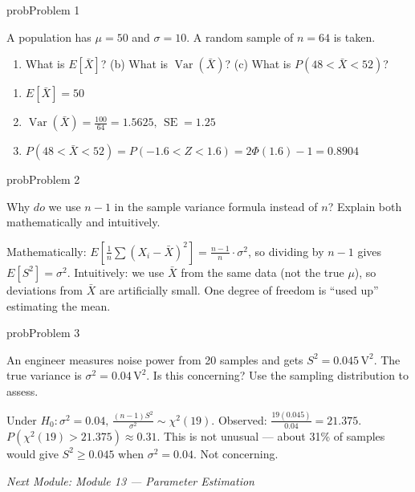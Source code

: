 \begin{PSbox}[unbreakable]{prob}{Problem 1}

A population has $\mu = 50$ and $\sigma = 10$. A random sample of $n = 64$ is taken.

\begin{enumerate}
\def\labelenumi{(\alph{enumi})}
\tightlist
\item
  What is $E[\bar{X}]$? (b) What is $\operatorname{Var}(\bar{X})$? (c) What is $P(48 < \bar{X} < 52)$?
\end{enumerate}

\PSsolution{} 

\begin{enumerate}
\def\labelenumi{(\alph{enumi})}
\tightlist
\item
  $E[\bar{X}] = 50$
\item
  $\displaystyle \operatorname{Var}(\bar{X}) = \frac{100}{64} = 1.5625,\, \operatorname{SE} = 1.25$
\item
  $P(48 < \bar{X} < 52) = P(-1.6 < Z < 1.6) = 2\Phi (1.6) - 1 = 0.8904$
\end{enumerate}

\end{PSbox}

\begin{PSbox}[unbreakable]{prob}{Problem 2}

Why $do$ we use $n-1$ in the sample variance formula instead of $n$? Explain both mathematically and intuitively.

\PSsolution{} Mathematically: $E\left[\frac{1}{n}\sum (X_{i}-\bar{X})^{2}\right] = \frac{n-1}{n} \cdot \sigma^{2}$, so dividing by $n-1$ gives $E[S^{2}] = \sigma^{2}$. Intuitively: we use $\bar{X}$ from the same data (not the true $\mu$), so deviations from $\bar{X}$ are artificially small. One degree of freedom is ``used up'' estimating the mean.

\end{PSbox}

\begin{PSbox}[unbreakable]{prob}{Problem 3}

An engineer measures noise power from 20 samples and gets $S^{2} = 0.045\,\mathrm{V}^{2}$. The true variance is $\sigma^{2} = 0.04\,\mathrm{V}^{2}$. Is this concerning? Use the sampling distribution to assess.

\PSsolution{} Under $H_{0}: \sigma^{2} = 0.04,\, \frac{(n-1)S^{2}}{\sigma^{2}} \sim \chi^{2}(19)$. Observed: $\frac{19(0.045)}{0.04} = 21.375$. $P(\chi^{2}(19) > 21.375) \approx 0.31$. This is not unusual — about 31\% of samples would give $S^{2} \ge 0.045$ when $\sigma^{2} = 0.04$. Not concerning.

\emph{Next Module: {Module 13 — Parameter Estimation}}

\end{PSbox}
